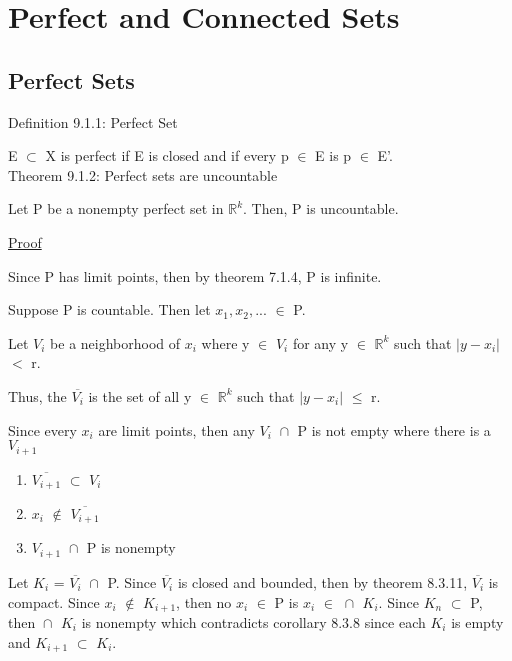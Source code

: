 \newpage
\section[Day 9: Perfect \& Connected Sets]{Perfect and Connected Sets}





\subsection{ Perfect Sets }

{ \color{blue} Definition 9.1.1: Perfect Set } 

	\begin{adjustbox}{minipage=14cm, right, vspace=0.1cm 0cm}
		E $\subset$ X is perfect if E is closed and if every p $\in$ E
		is p $\in$ E'. \\
	\end{adjustbox}

{ \color{red} Theorem 9.1.2: Perfect sets are uncountable } 

	\begin{adjustbox}{minipage=14cm, right, vspace=0.1cm 0cm}
		Let P be a nonempty perfect set in $\mathbb{R}^k$.
		Then, P is uncountable.
	\end{adjustbox}

{ \color{magenta} \underline{Proof} } 

	Since P has limit points, then by {\color{red} theorem 7.1.4},
	P is infinite.

	Suppose P is countable. Then let $x_1, x_2, ...$ $\in$ P.

	Let $V_i$ be a neighborhood of $x_i$ where y $\in$ $V_i$ for any
	y $\in$ $\mathbb{R}^k$ such that $|y-x_i|$ $<$ r.

	Thus, the $\overline{V_i}$ is the set of all y $\in$ $\mathbb{R}^k$
	such that $|y-x_i|$ $\leq$ r.

	Since every $x_i$ are limit points, then any $V_i$ $\cap_{}^{}$ P
	is not empty where there is a $V_{i+1}$

	\begin{enumerate}[label=(\alph*), leftmargin=1cm, itemsep=0.1cm]
		\item $\overline{V_{i+1}}$ $\subset$ $V_i$
		\item $x_i$ $\not \in$ $\overline{V_{i+1}}$
		\item $V_{i+1}$ $\cap_{}^{}$ P is nonempty
	\end{enumerate}

	Let $K_i$ = $\overline{V_i}$ $\cap_{}^{}$ P.
	Since $\overline{V_i}$ is closed and bounded, then by
	{\color{red} theorem 8.3.11}, $\overline{V_i}$ is compact.
	Since $x_i$ $\not \in$ $K_{i+1}$, then no $x_i$ $\in$ P is
	$x_i$ $\in$ $\cap_{}^{}$ $K_i$.
	Since $K_n$ $\subset$ P, then $\cap_{}^{}$ $K_i$ is nonempty
	which contradicts {\color{orange} corollary 8.3.8 } since
	each $K_i$ is empty and $K_{i+1}$ $\subset$ $K_i$. \\

